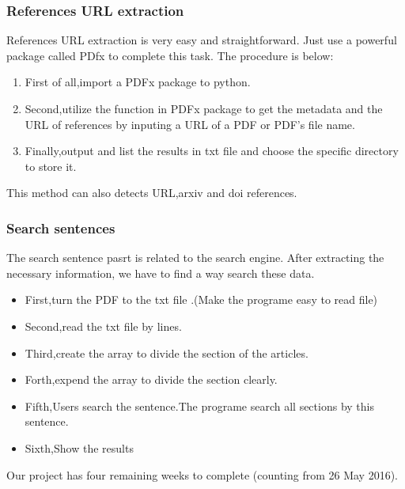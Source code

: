 \subsubsection*{References URL extraction}
References URL extraction is very easy and straightforward. Just use a powerful package called PDfx to complete this task.
The procedure is below:
\begin{enumerate}
   \item  First of all,import a PDFx package to python.\\
   \item  Second,utilize the function in PDFx package to get the metadata and the URL of references by inputing a URL of a PDF or PDF's file name.\\ 
   \item  Finally,output and list the results in txt file and choose the specific directory to store it. \\
\end{enumerate}
   
   This method can also detects URL,arxiv and doi references.




\subsubsection*{Search sentences}
The search sentence pasrt is  related to the search engine. After extracting the necessary information, we have to find a  way search these data.
\begin{itemize}
	\item First,turn the PDF to the txt file .(Make the programe easy to read file)\\ 
	\item Second,read the txt file by lines.\\ 	
	\item Third,create the array to divide the section of the articles.\\ 	
	\item Forth,expend the array to divide the section clearly.\\ 	
	\item Fifth,Users search the sentence.The programe search all sections by this sentence.\\
	\item Sixth,Show the results\\  		
	
\end{itemize}
Our project has four remaining weeks to complete (counting from 26 May 2016). 

\newpage %